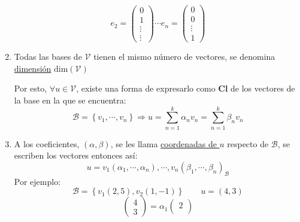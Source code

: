 \begin{enumerate}
\[                      e_2 =
                      \begin{pmatrix}
                              0      \\
                              1      \\
                              \vdots \\
                              \vdots
                      \end{pmatrix}
                      \cdots
                      e_n =
                      \begin{pmatrix}
                              0      \\
                              0      \\
                              \vdots \\
                              1
                      \end{pmatrix}
              \]
        \item Todas las bases de \(\mathcal{V}\) tienen el mismo número de vectores, se denomina \underline{dimensión} \(\text{dim}\left(\mathcal{V}\right) \)
              \par Por esto, \(\forall u \in \mathcal{V}\), existe una forma de expresarlo como \textbf{Cl} de los vectores de la base en la que se encuentra:
              \[
                      \mathcal{B} = \left\{v_1,\cdots, v_n\right\}  \Rightarrow u = \sum^k_{n=1}\alpha_n v_n =\sum^k_{n=1}\beta_n v_n
              \]
        \item A los coeficientes, \(\left(\alpha, \beta\right) \), se les llama \underline{coordenadas de \(u\)} respecto de \(\mathcal{B}\), se escriben los vectores entonces así:
              \[
                      \boxed{u = v_1\left(\alpha_1,\cdots,\alpha_n\right),\cdots,v_n\left(\beta_1,\cdots,\beta_n\right)_\mathcal{B} }
              \]
              Por ejemplo:
              \[
                      \mathcal{B} = \left\{v_1\left(2,5\right) , v_2\left(1,-1\right) \right\} \hspace{2em} u=\left(4,3\right)
              \]
              \[
                      \begin{pmatrix}
                              4
                              \\
                              3
                      \end{pmatrix}
                      =\alpha_1
                      \begin{pmatrix}
                              2
                              \\

\end{pmatrix}\]
\end{enumerate}
